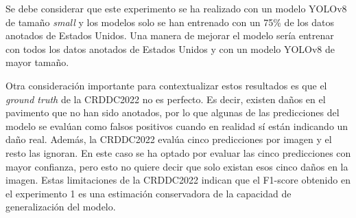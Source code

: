 \begin{table}[H]
    \centering
    \caption{F1-scores para los 10 primeros equipos en la plataforma de la CRDDC2022 para los datos de test de Estados Unidos en el momento del cierre de la competición.}
    \label{tab:top10_f1_scores}
\end{table}

Se debe considerar que este experimento se ha realizado con un modelo YOLOv8 de tamaño \textit{small} y los modelos solo se han entrenado con un 75\% de los datos anotados de Estados Unidos. Una manera de mejorar el modelo sería entrenar con todos los datos anotados de Estados Unidos y con un modelo YOLOv8 de mayor tamaño.

Otra consideración importante para contextualizar estos resultados es que el \textit{ground truth} de la CRDDC2022 no es perfecto. Es decir, existen daños en el pavimento que no han sido anotados, por lo que algunas de las predicciones del modelo se evalúan como falsos positivos cuando en realidad sí están indicando un daño real. Además, la CRDDC2022 evalúa cinco predicciones por imagen y el resto las ignoran. En este caso se ha optado por evaluar las cinco predicciones con mayor confianza, pero esto no quiere decir que solo existan esos cinco daños en la imagen. Estas limitaciones de la CRDDC2022 indican que el F1-score obtenido en el experimento 1 es una estimación conservadora de la capacidad de generalización del modelo.

